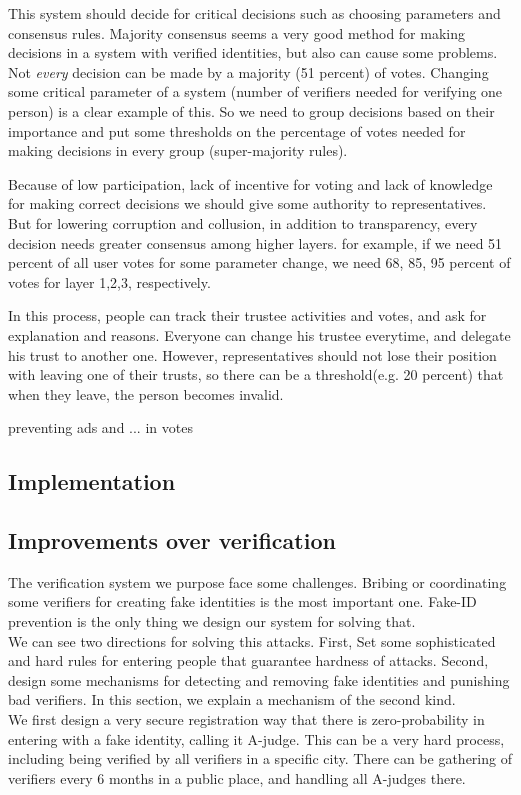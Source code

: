 \documentclass[conference]{IEEEtran}
\begin{document}
This system should decide for critical decisions such as choosing parameters and consensus rules. Majority consensus seems a very good method for making decisions in a system with verified identities, but also can cause some problems. Not \textit{every} decision can be made by a majority (51 percent) of votes. Changing some critical parameter of a system (number of verifiers needed for verifying one person) is a clear example of this. So we need to group decisions based on their importance and put some thresholds on the percentage of votes needed for making decisions in every group (super-majority rules).


Because of low participation, lack of incentive for voting and lack of knowledge for making correct decisions we should give some authority to representatives. But for lowering corruption and collusion, in addition to transparency, every decision needs greater consensus among higher layers. for example, if we need 51 percent of all user votes for some parameter change, we need 68, 85, 95 percent  of votes for layer 1,2,3, respectively.


In this process, people can track their trustee activities and votes, and ask for explanation and reasons. Everyone can change his trustee everytime, and delegate his trust to another one. However, representatives should not lose their position with leaving one of their trusts, so there can be a threshold(e.g. 20 percent) that when they leave, the person becomes invalid. 


preventing ads and ... in votes\\

\subsection{Implementation}

\subsection{Improvements over verification}
The verification system we purpose face some challenges. Bribing or coordinating some verifiers for creating fake identities is the most important one. Fake-ID prevention is the only thing we design our system for solving that. \\
We can see two directions for solving this attacks. First, Set some sophisticated and hard rules for entering people that guarantee hardness of attacks. Second, design some mechanisms for detecting and removing fake identities and punishing bad verifiers. In this section, we explain a mechanism of the second kind. \\
We first design a very secure registration way that there is zero-probability in entering with a fake identity, calling it A-judge. This can be a very hard process, including being verified by all verifiers in a specific city. There can be gathering of verifiers every 6 months in a public place, and handling all A-judges there.
\end{document}
